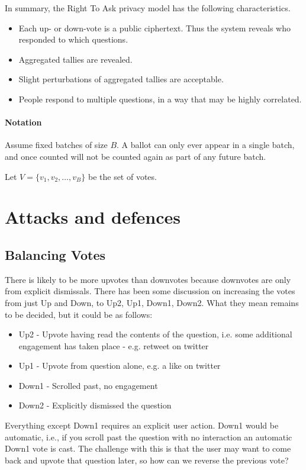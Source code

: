 \documentclass[10pt,a4paper]{article}
\begin{document}
In summary, the Right To Ask privacy model has the following characteristics. 
\begin{itemize}
	\item Each up- or down-vote is a public ciphertext. Thus the system reveals who responded to which questions.
	\item Aggregated tallies are revealed.
	\item Slight perturbations of aggregated tallies are acceptable.
	\item People respond to multiple questions, in a way that may be highly correlated.
\end{itemize}


\paragraph{Notation} Assume fixed batches of size $B$. A ballot can only ever appear in a single batch, and once counted will not be counted again as part of any future batch. 

Let $V = \{ v_1, v_2,\ldots,v_B\}$ be the set of votes.

\section{Attacks and defences}

\subsection{Balancing Votes}
There is likely to be more upvotes than downvotes because downvotes are only from explicit dismissals. There has been some discussion on increasing the votes from just Up and Down, to Up2, Up1, Down1, Down2. What they mean remains to be decided, but it could be as follows:
\begin{itemize}
\item Up2 - Upvote having read the contents of the question, i.e. some additional engagement has taken place - e.g. retweet on twitter
\item Up1 - Upvote from question alone, e.g. a like on twitter
\item Down1 - Scrolled past, no engagement
\item Down2 - Explicitly dismissed the question
\end{itemize}

Everything except Down1 requires an explicit user action. Down1 would be automatic, i.e., if you scroll past the question with no interaction an automatic Down1 vote is cast. The challenge with this is that the user may want to come back and upvote that question later, so how can we reverse the previous vote?
\end{document}
